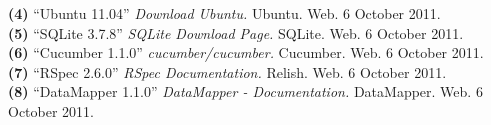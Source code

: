 \documentclass{article}
\begin{document}
\noindent\hangindent=1.4cm
\textbf{(4)} ``Ubuntu 11.04'' 
\emph{Download Ubuntu.} Ubuntu. Web.  6 October 2011.\\

\noindent\hangindent=1.4cm
\textbf{(5)} ``SQLite 3.7.8'' 
\emph{SQLite Download Page.} SQLite. Web.  6 October 2011.\\

\noindent\hangindent=1.4cm
\textbf{(6)} ``Cucumber 1.1.0'' 
\emph{cucumber/cucumber.} Cucumber. Web.  6 October 2011.\\

\noindent\hangindent=1.4cm
\textbf{(7)} ``RSpec 2.6.0'' 
\emph{RSpec Documentation.} Relish. Web.  6 October 2011.\\

\noindent\hangindent=1.4cm
\textbf{(8)} ``DataMapper 1.1.0'' 
\emph{DataMapper - Documentation.} DataMapper. Web.  6 October 2011.\\
\end{document}
